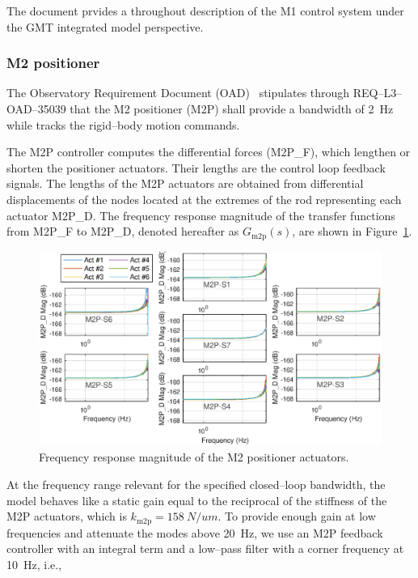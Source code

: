  The document \cite{GMT.DOC.05153} prvides a throughout description of the M1 control system under the GMT integrated model perspective.

\subsubsection{M2 positioner}
\label{sec:m2-ctrlr}


The Observatory Requirement Document (OAD)~\cite{OAD_verF2020} stipulates through REQ--L3--OAD--35039 that the M2 positioner (M2P) shall provide a bandwidth of \SI{2}{Hz} while tracks the rigid--body motion commands.


The M2P controller computes the differential forces (\textsf{M2P\_F}), which lengthen or shorten the positioner actuators. Their lengths are the control loop feedback signals. The lengths of the M2P actuators are obtained from differential displacements of the nodes located at the extremes of the rod representing each actuator \textsf{M2P\_D}. The frequency response magnitude of the transfer functions from \textsf{M2P\_F} to \textsf{M2P\_D}, denoted hereafter as $G_\text{m2p}(s)$, are shown in Figure~\ref{fig:M2P_G}. %
%
\begin{figure}[!hbt]
    \vspace{6pt}
    \centering
    \includegraphics[width=\textwidth]{./ctrl_sec_images/M2P_G.eps}
    \caption{Frequency response magnitude of the M2 positioner actuators.}
    \label{fig:M2P_G}
\end{figure}
%
At the frequency range relevant for the specified closed--loop bandwidth, the model behaves like a static gain equal to the reciprocal of the stiffness of the M2P actuators, which is $k_\text{m2p}=\SI{158}{N/um}$. %
To provide enough gain at low frequencies and attenuate the modes above \SI{20}{Hz}, we use an M2P feedback controller with an integral term and a low--pass filter with a corner frequency at \SI{10}{Hz}, i.e.,
